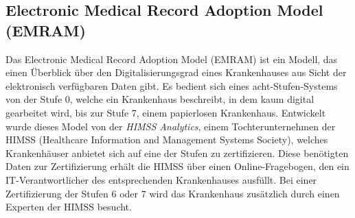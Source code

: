 \subsection{Electronic Medical Record Adoption Model (EMRAM)}
\label{sec:EMRAM}
	Das Electronic Medical Record Adoption Model (EMRAM) ist ein Modell, das einen Überblick über den Digitalisierungsgrad eines Krankenhauses aus Sicht der elektronisch verfügbaren Daten gibt. Es bedient sich eines acht-Stufen-Systems von der Stufe 0, welche ein Krankenhaus beschreibt, in dem kaum digital gearbeitet wird, bis zur Stufe 7, einem papierlosen Krankenhaus. Entwickelt wurde dieses Model von der \textit{HIMSS Analytics}, einem Tochterunternehmen der HIMSS (Healthcare Information and Management Systems Society), welches Krankenhäuser anbietet sich auf eine der Stufen zu zertifizieren. Diese benötigten Daten zur Zertifizierung erhält die HIMSS über einen Online-Fragebogen, den ein IT-Verantwortlicher des entsprechenden Krankenhauses ausfüllt. Bei einer Zertifizierung der Stufen 6 oder 7 wird das Krankenhaus zusätzlich durch einen Experten der HIMSS besucht.

	\parencite{Stephani2019}
